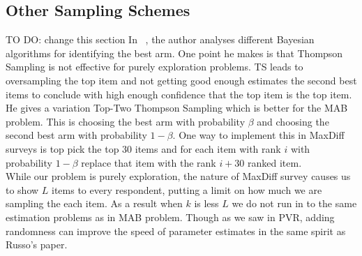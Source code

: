 \documentclass[nonblindrev]{informs3}
\begin{document}
\subsection{Other Sampling Schemes}
TO DO: change this section
In ~\cite{russo2016simple}, the author analyses different Bayesian algorithms for identifying the best arm. One point he makes is that Thompson Sampling is not effective for purely exploration problems. TS leads to oversampling the top item and not getting good enough estimates the second best items to conclude with high enough confidence that the top item is the top item. He gives a variation Top-Two Thompson Sampling which is better for the MAB problem. This is choosing the best arm with probability $\beta$ and choosing the second best arm with probability $1-\beta$. One way to implement this in MaxDiff surveys is top pick the top 30 items and for each item with rank $i$ with probability $1-\beta$ replace that item with the rank $i+30$ ranked item.\\
While our problem is purely exploration, the nature of MaxDiff survey causes us to show $L$ items to every respondent, putting a limit on how much we are sampling the each item. As a result when $k$ is less $L$ we do not run in to the same estimation problems as in MAB problem. Though as we saw in PVR, adding randomness can improve the speed of parameter estimates in the same spirit as Russo's paper.\\

\end{document}
